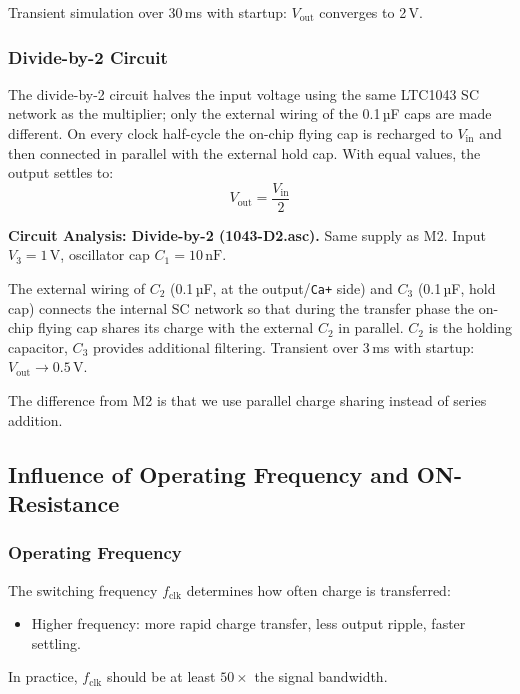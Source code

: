	Transient simulation over 30\,ms with startup: $V_{\text{out}}$ converges to 2\,V.

\subsubsection{Divide-by-2 Circuit}

The divide-by-2 circuit halves the input voltage using the same LTC1043 SC network as the multiplier; only the external wiring of the 0.1\,µF caps are made different. On every clock half-cycle the on-chip flying cap is recharged to $V_{\text{in}}$ and then connected in parallel with the external hold cap. With equal values, the output settles to:
\begin{equation}
	V_{\text{out}} = \frac{V_{\text{in}}}{2}
\end{equation}

\textbf{Circuit Analysis: Divide-by-2 (1043-D2.asc).}
	Same supply as M2. Input $V_3 = 1\,\text{V}$, oscillator cap $C_1 = 10\,\text{nF}$.

	The external wiring of $C_2$ (0.1\,µF, at the output/\texttt{Ca+} side) and $C_3$ (0.1\,µF, hold cap) connects the internal SC network so that during the transfer phase the on-chip flying cap shares its charge with the external $C_2$ in parallel. $C_2$ is the holding capacitor, $C_3$ provides additional filtering. Transient over 3\,ms with startup: $V_{\text{out}} \to 0.5\,\text{V}$.

	The difference from M2 is that we use parallel charge sharing instead of series addition.

\subsection{Influence of Operating Frequency and ON-Resistance}

\subsubsection{Operating Frequency}

The switching frequency $f_{\text{clk}}$ determines how often charge is transferred:
\begin{itemize}
	\item Higher frequency: more rapid charge transfer, less output ripple, faster settling. 
\end{itemize}

In practice, $f_{\text{clk}}$ should be at least $50\times$ the signal bandwidth.

